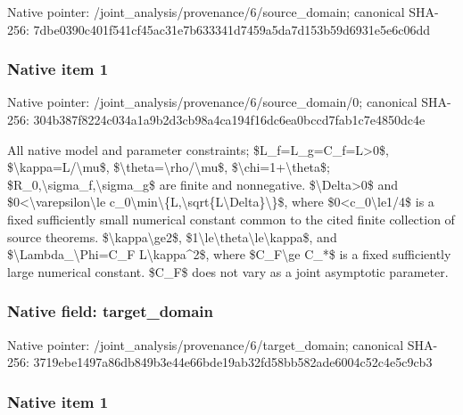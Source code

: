 \documentclass[10pt,a4paper]{article}
\begin{document}
Native pointer: /joint\_analysis/provenan\allowbreak{}ce/6/source\_domain; canonical SHA-256: 7dbe0390c401f541cf45ac31\allowbreak{}e7b633341d7459a5da7d153b\allowbreak{}59d6931e5e6c06dd



\subsubsection{Native item 1}


Native pointer: /joint\_analysis/provenan\allowbreak{}ce/6/source\_domain/0; canonical SHA-256: 304b387f8224c034a1a9b2d3\allowbreak{}cb98a4ca194f16dc6ea0bccd\allowbreak{}7fab1c7e4850dc4e


All native model and parameter constraints; \$L\_f=L\_g=C\_f=L>0\$, \$\textbackslash{}kappa=L/\textbackslash{}mu\$, \$\textbackslash{}theta=\textbackslash{}rho/\textbackslash{}mu\$, \$\textbackslash{}chi=1+\textbackslash{}theta\$; \$R\_0,\textbackslash{}sigma\_f,\textbackslash{}sigma\_g\$ are finite and nonnegative. \$\textbackslash{}Delta>0\$ and \$0<\textbackslash{}varepsilon\textbackslash{}le c\_0\textbackslash{}min\textbackslash{}\{L,\textbackslash{}sqrt\{L\textbackslash{}Delta\}\textbackslash{}\}\$, where \$0<c\_0\textbackslash{}le1/4\$ is a fixed sufficiently small numerical constant common to the cited finite collection of source theorems. \$\textbackslash{}kappa\textbackslash{}ge2\$, \$1\textbackslash{}le\textbackslash{}theta\textbackslash{}le\textbackslash{}kappa\$, and \$\textbackslash{}Lambda\_\textbackslash{}Phi=C\_F L\textbackslash{}kappa\textasciicircum{}2\$, where \$C\_F\textbackslash{}ge C\_*\$ is a fixed sufficiently large numerical constant. \$C\_F\$ does not vary as a joint asymptotic parameter.


\subsubsection{Native field: target\_domain}


Native pointer: /joint\_analysis/provenan\allowbreak{}ce/6/target\_domain; canonical SHA-256: 3719ebe1497a86db849b3e44\allowbreak{}e66bde19ab32fd58bb582ade\allowbreak{}6004c52c4e5c9cb3



\subsubsection{Native item 1}
\end{document}
